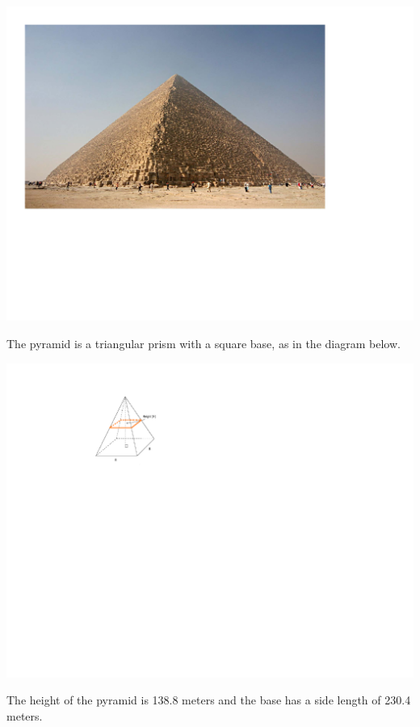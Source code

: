 \documentclass[12pt]{article}
\begin{document}
\begin{enumerate}
\begin{center}
\includegraphics[scale=0.5]{giza.pdf}
\end{center}

The pyramid is a triangular prism with a square base, as in the diagram below.  

\begin{center}
\includegraphics[scale=1.5]{pyramid.pdf}
\end{center}

The height of the pyramid is 138.8 meters and the base has a side length of 230.4 meters.  

\begin{enumerate} 


\end{enumerate}
\end{enumerate}
\end{document}
